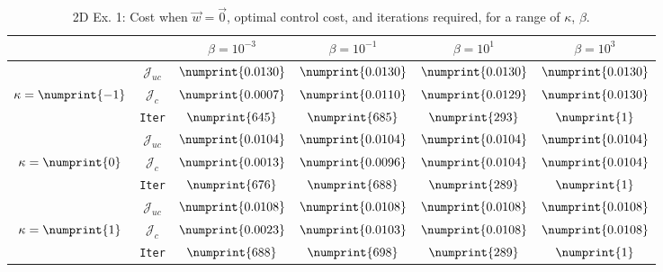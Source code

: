 \begin{table}
\begin{tabular}{ | c | c || c | c | c | c ||}
\hline
\multicolumn{2}{|c||}{}& $\beta = 10^{-3}$ & $\beta = 10^{-1}$ & $\beta = 10^{1}$ & $\beta = 10^{3}$  \\
\hline
\hline
 & $\mathcal{J}_{uc}$ & $\numprint{0.0130}$ & $\numprint{0.0130}$ & $\numprint{0.0130}$ & $\numprint{0.0130}$ \\
$\kappa= \numprint{-1}$  & $\mathcal{J}_c$ & $\numprint{0.0007}$ & $\numprint{0.0110}$ & $\numprint{0.0129}$ & $\numprint{0.0130}$ \\
& \texttt{Iter} & $\numprint{645}$ & $\numprint{685}$ & $\numprint{293}$ & $\numprint{1}$ \\
\hline
 & $\mathcal{J}_{uc}$ & $\numprint{0.0104}$ & $\numprint{0.0104}$ & $\numprint{0.0104}$ & $\numprint{0.0104}$ \\
$\kappa= \numprint{0}$  & $\mathcal{J}_c$ & $\numprint{0.0013}$ & $\numprint{0.0096}$ & $\numprint{0.0104}$ & $\numprint{0.0104}$ \\
& \texttt{Iter} & $\numprint{676}$ & $\numprint{688}$ & $\numprint{289}$ & $\numprint{1}$ \\
\hline
 & $\mathcal{J}_{uc}$ & $\numprint{0.0108}$ & $\numprint{0.0108}$ & $\numprint{0.0108}$ & $\numprint{0.0108}$ \\
$\kappa= \numprint{1}$  & $\mathcal{J}_c$ & $\numprint{0.0023}$ & $\numprint{0.0103}$ & $\numprint{0.0108}$ & $\numprint{0.0108}$ \\
& \texttt{Iter} & $\numprint{688}$ & $\numprint{698}$ & $\numprint{289}$ & $\numprint{1}$ \\
\hline
\end{tabular}
\caption{2D Ex. 1: Cost when $\vec{w}=\vec{0}$, optimal control cost, and iterations required, for a range of $\kappa$, $\beta$.}
\label{TabS5:Prob12D}
\end{table}